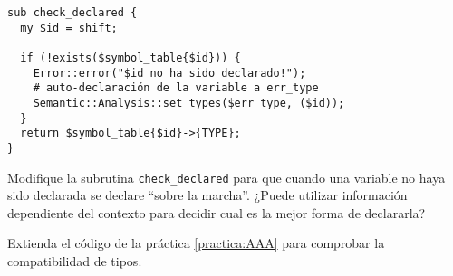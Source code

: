 \begin{verbatim}
sub check_declared {
  my $id = shift;

  if (!exists($symbol_table{$id})) {
    Error::error("$id no ha sido declarado!");
    # auto-declaración de la variable a err_type
    Semantic::Analysis::set_types($err_type, ($id));
  }
  return $symbol_table{$id}->{TYPE};
}
\end{verbatim}



Modifique la subrutina \verb|check_declared| para que cuando
una variable no haya sido declarada se declare ``sobre la marcha''. 
¿Puede utilizar 
información dependiente del contexto para decidir cual es la mejor forma
de declararla?

\label{practica:analisis_semantico}
Extienda el código de la práctica 
\ref{practica:AAA}
para comprobar la compatibilidad de tipos.

